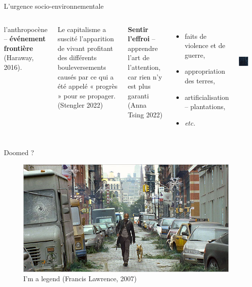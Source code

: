 \documentclass[newPxFont]{beamer}
\begin{document}
\begin{frame}[c]{L'urgence socio-environnementale}
  \vspace{-1cm}
  \begin{columns}[onlytextwidth,T]
    \column{\dimexpr\linewidth-30mm-5mm}

    l'anthropocène -- \textbf{événement frontière} (Haraway, 2016).
  
    Le capitalisme a suscité l'apparition de vivant profitant des différents bouleversements causés par ce qui a été appelé « progrès » pour se propager. (Stengler 2022)
    
    \textbf{Sentir l'effroi} -- apprendre l'art de l'attention, car rien n'y est plus garanti (Anna Tsing 2022)

    \begin{itemize}
      \item faits de violence et de guerre,
      \item appropriation des terres,
      \item artificialisation -- plantations,
      \item \textit{etc.}
    \end{itemize}

    \column{30mm}
    \vspace{2cm}
    \includegraphics[height=4cm]{img/Honduras.jpg}

  \end{columns}
\end{frame}

\begin{frame}[c]{Doomed ?}
\vspace{-1cm}

\begin{figure}
  \includegraphics[width=\textwidth]{img/im_legend-600.jpg}
  \caption{I'm a legend (Francis Lawrence, 2007)}
\end{figure}
\end{frame}
\end{document}
